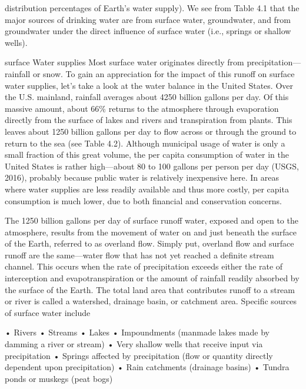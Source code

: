 \documentclass{article}
\begin{document}
distribution percentages of Earth's water supply). We see from Table 4.1
that the major sources of drinking water are from surface water,
groundwater, and from groundwater under the direct influence of surface
water (i.e., springs or shallow wells).

surface Water supplies Most surface water originates directly from
precipitation---rainfall or snow. To gain an appreciation for the impact
of this runoff on surface water supplies, let's take a look at the water
balance in the United States. Over the U.S. mainland, rainfall averages
about 4250 billion gallons per day. Of this massive amount, about 66\%
returns to the atmosphere through evaporation directly from the surface
of lakes and rivers and transpiration from plants. This leaves about
1250 billion gallons per day to flow across or through the ground to
return to the sea (see Table 4.2). Although municipal usage of water is
only a small fraction of this great volume, the per capita consumption
of water in the United States is rather high---about 80 to 100 gallons
per person per day (USGS, 2016), probably because public water is
relatively inexpensive here. In areas where water supplies are less
readily available and thus more costly, per capita consumption is much
lower, due to both financial and conservation concerns.

The 1250 billion gallons per day of surface runoff water, exposed and
open to the atmosphere, results from the movement of water on and just
beneath the surface of the Earth, referred to as overland flow. Simply
put, overland flow and surface runoff are the same---water flow that has
not yet reached a definite stream channel. This occurs when the rate of
precipitation exceeds either the rate of interception and
evapotranspiration or the amount of rainfall readily absorbed by the
surface of the Earth. The total land area that contributes runoff to a
stream or river is called a watershed, drainage basin, or catchment
area. Specific sources of surface water include

• Rivers • Streams • Lakes • Impoundments (manmade lakes made by damming
a river or stream) • Very shallow wells that receive input via
precipitation • Springs affected by precipitation (flow or quantity
directly dependent upon precipitation) • Rain catchments (drainage
basins) • Tundra ponds or muskegs (peat bogs)
\end{document}
